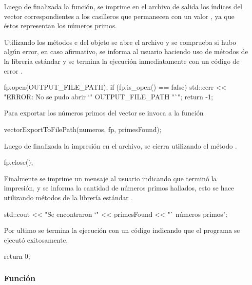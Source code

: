 \documentclass[12pt]{article}
\newenvironment{fullgrayverb}
{\verbbox}
{\endverbbox\par\colorbox{gray!25}{\parbox{\textwidth}{\theverbbox}}\par}
\begin{document}
Luego de finalizada la función, se imprime en el archivo de salida los índices
del vector correspondientes a los casilleros que permanecen con un valor
, ya que éstos representan los números primos.

Utilizando los métodos  e  del objeto  se
abre el archivo  y se comprueba si hubo algún error, en caso
afirmativo, se informa al usuario haciendo uso de métodos de la librería
estándar  y se termina la ejecución inmediatamente con un código
de error .

\begin{fullgrayverb}[\mbox{}]
fp.open(OUTPUT_FILE_PATH);
if (fp.is_open() == false) {
    std::cerr << "ERROR: No se pudo abrir `" OUTPUT_FILE_PATH "`\n";
    return -1;
}
\end{fullgrayverb}

Para exportar los números primos del vector se invoca a la función
\linebreak{}

\begin{fullgrayverb}[\mbox{}]
vectorExportToFilePath(numeros, fp, primesFound);
\end{fullgrayverb}

Luego de finalizada la impresión en el archivo, se cierra utilizando el método
.

\begin{fullgrayverb}[\mbox{}]
fp.close();
\end{fullgrayverb}

Finalmente se imprime un mensaje al usuario indicando que terminó la impresión,
y se informa la cantidad de números primos hallados, esto se hace utilizando
métodos de la librería estándar .

\begin{fullgrayverb}[\mbox{}]
std::cout << "Se encontraron `" << primesFound << "` números primos\n";
\end{fullgrayverb}

Por ultimo se termina la ejecución con un código  indicando que el
programa se ejecutó exitosamente.

\begin{fullgrayverb}[\mbox{}]
return 0;
\end{fullgrayverb}

\subsubsection{Función }
\end{document}
